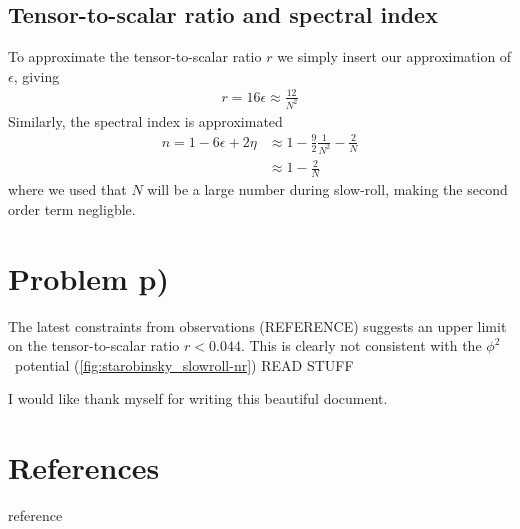 \documentclass[reprint,english,notitlepage]{revtex4-1}  %
\numberwithin{equation}{section}
\begin{document}
\subsection{Tensor-to-scalar ratio and spectral index}
To approximate the tensor-to-scalar ratio $r$ we simply insert our approximation
of $\epsilon$, giving
\begin{align}
	r = 16\epsilon \approx \frac{12}{N^2}
\end{align}
Similarly, the spectral index is approximated
\begin{align}
	n = 1 - 6\epsilon + 2\eta &\approx 1 - \frac{9}{2}\frac{1}{N^2} - \frac{2}{N} \\
														&\approx 1 - \frac{2}{N}
\end{align}
where we used that $N$ will be a large number during slow-roll, making the
second order term negligble.
\section{Problem p)}
The latest constraints from observations (REFERENCE) suggests an upper limit
on the tensor-to-scalar ratio $r<0.044$. This is clearly not consistent with
the $\phi^2$ potential (\ref{fig:starobinsky_slowroll-nr})
READ STUFF

\begin{acknowledgments}  %
I would like thank myself for writing this beautiful document.
\end{acknowledgments}

\section*{References}

\begin{itemize}
	 reference
\end{itemize}
\end{document}
